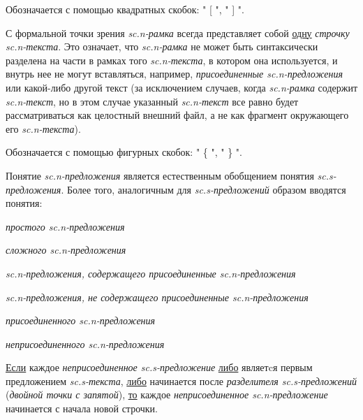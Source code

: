 \begin{SCn}
\end{SCn}

Обозначается с помощью квадратных скобок: " [ "{}, " ] "{}.

С формальной точки зрения \textit{sc.n-рамка} всегда представляет собой \uline{одну} \textit{строчку sc.n-текста}. Это означает, что \textit{sc.n-рамка} не может быть синтаксически разделена на части в рамках того \textit{sc.n-текста}, в котором она используется, и внутрь нее не могут вставляться, например, \textit{присоединенные sc.n-предложения} или какой-либо другой текст (за исключением случаев, когда \textit{sc.n-рамка} содержит \textit{sc.n-текст}, но в этом случае указанный \textit{sc.n-текст} все равно будет рассматриваться как целостный внешний файл, а не как фрагмент окружающего его \textit{sc.n-текста}). 

\begin{SCn}
\end{SCn}

Обозначается с помощью фигурных скобок: " \{ "{}, " \} "{}.

Понятие \textit{sc.n-предложения} является естественным обобщением понятия \textit{sc.s-предложения}. Более того, аналогичным для \textit{sc.s-предложений} образом вводятся понятия:
\begin{textitemize}
	\item \textit{простого sc.n-предложения}
	\item \textit{сложного sc.n-предложения}
	\item \textit{sc.n-предложения, содержащего присоединенные sc.n-предложения}
	\item \textit{sc.n-предложения, не содержащего присоединенные sc.n-предложения}
	\item \textit{присоединенного sc.n-предложения}
	\item \textit{неприсоединенного sc.n-предложения}
\end{textitemize}

\uline{Если} каждое \textit{неприсоединенное sc.s-предложение} \uline{либо} являетcя первым предложением \textit{sc.s-текста}, \uline{либо} начинается после \textit{разделителя sc.s-предложений} (\textit{двойной точки с запятой}), \uline{то} каждое \textit{неприсоединенное sc.n-предложение} начинается с начала новой строчки.

